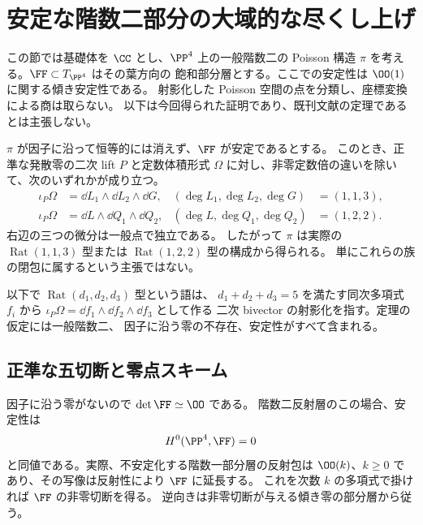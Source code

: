 
\section{安定な階数二部分の大域的な尽くし上げ}
\label{sec:stable-rank-two-complete}

この節では基礎体を $\CC$ とし、$\PP^4$ 上の一般階数二の
Poisson 構造 $\pi$ を考える。$\FF\subset T_{\PP^4}$ はその葉方向の
飽和部分層とする。ここでの安定性は $\OO(1)$ に関する傾き安定性である。
射影化した Poisson 空間の点を分類し、座標変換による商は取らない。
以下は今回得られた証明であり、既刊文献の定理であるとは主張しない。

\begin{theorem}[安定・零因子なしの階数二部分]
\label{thm:stable-rank-two-actual-rational}
$\pi$ が因子に沿って恒等的には消えず、$\FF$ が安定であるとする。
このとき、正準な発散零の二次 lift $P$ と定数体積形式
$\Omega$ に対し、非零定数倍の違いを除いて、次のいずれかが成り立つ。
\begin{align}
 \iota_P\Omega&=\dd L_1\wedge\dd L_2\wedge\dd G,
 & (\deg L_1,\deg L_2,\deg G)&=(1,1,3),
 \label{eq:stable-rat113}\\
 \iota_P\Omega&=\dd L\wedge\dd Q_1\wedge\dd Q_2,
 & (\deg L,\deg Q_1,\deg Q_2)&=(1,2,2).
 \label{eq:stable-rat122}
\end{align}
右辺の三つの微分は一般点で独立である。
したがって $\pi$ は実際の $\operatorname{Rat}(1,1,3)$ 型または
$\operatorname{Rat}(1,2,2)$ 型の構成から得られる。
単にこれらの族の閉包に属するという主張ではない。
\end{theorem}

以下で $\operatorname{Rat}(d_1,d_2,d_3)$ 型という語は、
$d_1+d_2+d_3=5$ を満たす同次多項式 $f_i$ から
$\iota_P\Omega=\dd f_1\wedge\dd f_2\wedge\dd f_3$ として作る
二次 bivector の射影化を指す。定理の仮定には一般階数二、
因子に沿う零の不存在、安定性がすべて含まれる。

\subsection{正準な五切断と零点スキーム}

因子に沿う零がないので $\det\FF\simeq\OO$ である。
階数二反射層のこの場合、安定性は
\begin{equation}
 H^0(\PP^4,\FF)=0
 \label{eq:stable-no-linear-tangent}
\end{equation}
と同値である。実際、不安定化する階数一部分層の反射包は
$\OO(k)$、$k\geq0$ であり、その写像は反射性により $\FF$ に延長する。
これを次数 $k$ の多項式で掛ければ $\FF$ の非零切断を得る。
逆向きは非零切断が与える傾き零の部分層から従う。

